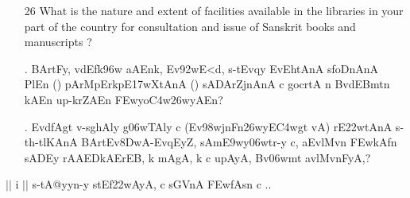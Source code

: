 {\begin{itemize}
\begin{itemize}
           \item[(b)] Is the work of collecting Sanskrit manuscripts adequately organised in your region ?
           
           \item[(c)] Is the condition of Sanskrit manuscripts in the manuscript libraries in your region satisfactory in respect of preservation and cataloguing ?
           
           \item[(d)] Are the facilities for the loan, copying, and preparation of photostats and microfilms of manuscripts and for the reading of microfilms adequate in those libraries ?
           
           \end{itemize} 

\item[26] What is the nature and extent of facilities available in the libraries in your part of the country for consultation and issue of Sanskrit books and manuscripts ?
\end{itemize}
}

\begin{itemize}
\item[{\dn \dnnum \rn{27}}.] {\dn BArtFy\4, v\4d\?Efk\4\396w aAEnk\4, Ev\392wE<d, s\2-tEvqy\? EvEhtAnA\2 s\2foDnAnA\2 PlEn {\rs (\re}{\dn\dnnum {}}{\rs )\re} pArMpErkpE\317wXtAnA\2 {\rs (\re}{\dn \dnnum {}}{\rs )\re} sADArZjnAnA\2 c gocrtA\2 n\?\2 BvdEBmt\?n kAEn up-krZAEn \3FEwyo\3C4w\326wyAEn{\rs ?\re}}

\item[{\dn \dnnum \rn{28}}.] {\dn Evd\?fAgt\? v-s\2g\5hAly\? g\5\306wTAly\? c {\rs (\re}Ev\398wjnFn\?\break \326wyE\3C4wgt\? vA{\rs )\re} rE\322wtAnA\2 s\2-th-tl\?KAnA\2{\rs ,\re} BArtEv\38DwA{\rs -\re}\-EvqEyZ, sAm\3E9wy\306wtr-y c{\rs ,\re} aEvlMv\?n \3FEwkAfn\2 sADEy\2 rAAEDkAErEB, k\? mAgA\0, k\? c upAyA, Bv\306wmt\? avlMvnFyA,{\rs ?\re}}

\end{itemize}

\begin{center}
$||$ {\dn\dnbf i }$||$ {\dn\dnbf s\2-tA@yyn-y s\2tEf\322wAyA, c  s\2GVnA\2 \3FEwfAsn\2 c ..}
\end{center}

